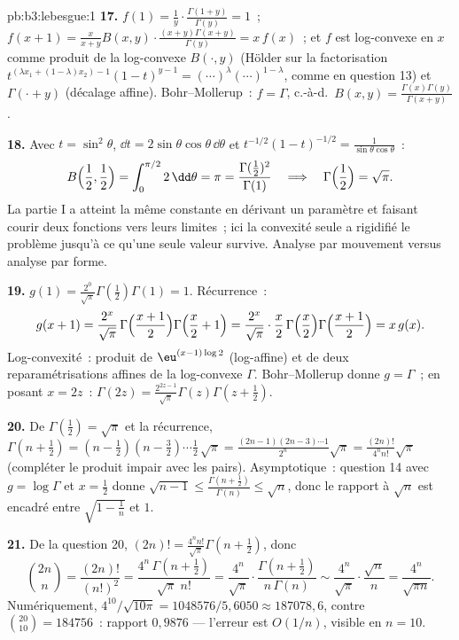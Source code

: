 \begin{solution}{pb:b3:lebesgue:1}
\textbf{17.} $f(1) =
\frac1y\cdot\frac{\Gamma(1+y)}{\Gamma(y)} = 1$~; $f(x+1) =
\frac{x}{x+y}B(x,y)\cdot\frac{(x+y)\Gamma(x+y)}{\Gamma(y)}
= x\,f(x)$~; et $f$ est log-convexe en $x$ comme produit de
la log-convexe $B(\cdot, y)$ (Hölder sur la factorisation
$t^{(\lambda x_1 + (1-\lambda)x_2)-1}(1-t)^{y-1} =
(\cdots)^\lambda(\cdots)^{1-\lambda}$, comme en question
13) et $\Gamma(\cdot + y)$ (décalage affine).
Bohr--Mollerup~: $f = \Gamma$, c.-à-d.\ $B(x, y) =
\frac{\Gamma(x)\Gamma(y)}{\Gamma(x+y)}$.

\textbf{18.} Avec $t = \sin^2\theta$, $\dd t =
2\sin\theta\cos\theta\,\dd\theta$ et $t^{-1/2}(1-t)^{-1/2}
= \frac1{\sin\theta\cos\theta}$~:
\[
B\Bigl(\frac12, \frac12\Bigr) =
\int_0^{\pi/2}2\,\dd\theta = \pi
= \frac{\Gamma(\frac12)^2}{\Gamma(1)}
\quad\Longrightarrow\quad
\Gamma\Bigl(\frac12\Bigr) = \sqrt\pi .
\]
La partie I a atteint la même constante en dérivant un
paramètre et faisant courir deux fonctions vers leurs
limites~; ici la convexité seule a rigidifié le problème
jusqu'à ce qu'une seule valeur survive. Analyse par
mouvement versus analyse par forme.

\textbf{19.} $g(1) = \frac{2^0}{\sqrt\pi}\Gamma(\frac12)
\Gamma(1) = 1$. Récurrence~:
\[
g(x+1) = \frac{2^{x}}{\sqrt\pi}\,
\Gamma\Bigl(\frac{x+1}2\Bigr)\Gamma\Bigl(\frac x2 + 1\Bigr)
= \frac{2^{x}}{\sqrt\pi}\cdot\frac x2\,
\Gamma\Bigl(\frac x2\Bigr)\Gamma\Bigl(\frac{x+1}2\Bigr)
= x\,g(x) .
\]
Log-convexité~: produit de $\eu^{(x-1)\log2}$ (log-affine)
et de deux reparamétrisations affines de la log-convexe
$\Gamma$. Bohr--Mollerup donne $g = \Gamma$~; en posant $x
= 2z$~: $\Gamma(2z) =
\frac{2^{2z-1}}{\sqrt\pi}\Gamma(z)\Gamma(z + \frac12)$.

\textbf{20.} De $\Gamma(\frac12) = \sqrt\pi$ et la
récurrence, $\Gamma(n + \frac12) = (n - \frac12)(n -
\frac32)\cdots\frac12\,\sqrt\pi =
\frac{(2n-1)(2n-3)\cdots1}{2^n}\sqrt\pi =
\frac{(2n)!}{4^nn!}\sqrt\pi$ (compléter le produit impair
avec les pairs). Asymptotique~: question 14 avec $g =
\log\Gamma$ et $x = \frac12$ donne $\sqrt{n-1} \leq
\frac{\Gamma(n+\frac12)}{\Gamma(n)} \leq \sqrt n$, donc le
rapport à $\sqrt n$ est encadré entre $\sqrt{1 - \frac1n}$
et $1$.

\textbf{21.} De la question 20, $(2n)! =
\frac{4^nn!}{\sqrt\pi}\Gamma(n + \tfrac12)$, donc
\[
\binom{2n}n = \frac{(2n)!}{(n!)^2}
= \frac{4^n\,\Gamma(n+\frac12)}{\sqrt\pi\;n!}
= \frac{4^n}{\sqrt\pi}\cdot
\frac{\Gamma(n+\frac12)}{n\,\Gamma(n)}
\sim \frac{4^n}{\sqrt\pi}\cdot\frac{\sqrt n}{n}
= \frac{4^n}{\sqrt{\pi n}} .
\]
Numériquement, $4^{10}/\sqrt{10\pi} = 1048576/5{,}6050
\approx 187078{,}6$, contre $\binom{20}{10} = 184756$~:
rapport $0{,}9876$ --- l'erreur est $O(1/n)$, visible en
$n = 10$.


\end{solution}
